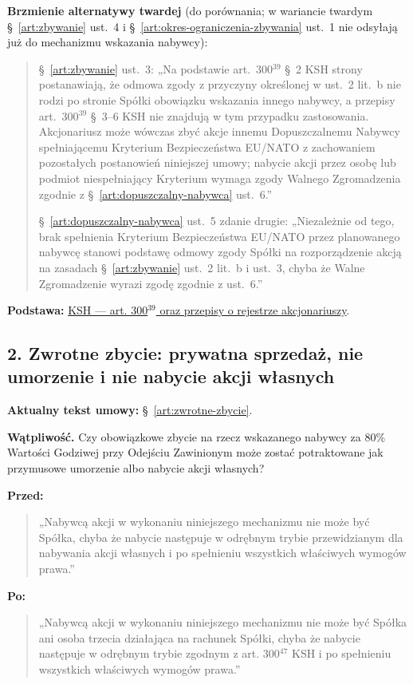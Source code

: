 \documentclass[12pt,a4paper]{report}
\begin{document}
\textbf{Brzmienie alternatywy twardej} (do porównania; w wariancie twardym §~\ref{art:zbywanie} ust.~4 i §~\ref{art:okres-ograniczenia-zbywania} ust.~1 nie odsyłają już do mechanizmu wskazania nabywcy):
\begin{quote}\small
§~\ref{art:zbywanie} ust.~3: „Na podstawie art.~300$^{39}$ §~2 KSH strony postanawiają, że odmowa zgody z przyczyny określonej w ust.~2 lit.~b nie rodzi po stronie Spółki obowiązku wskazania innego nabywcy, a przepisy art.~300$^{39}$ §~3--6 KSH nie znajdują w tym przypadku zastosowania. Akcjonariusz może wówczas zbyć akcje innemu Dopuszczalnemu Nabywcy spełniającemu Kryterium Bezpieczeństwa EU/NATO z zachowaniem pozostałych postanowień niniejszej umowy; nabycie akcji przez osobę lub podmiot niespełniający Kryterium wymaga zgody Walnego Zgromadzenia zgodnie z §~\ref{art:dopuszczalny-nabywca} ust.~6.”

§~\ref{art:dopuszczalny-nabywca} ust.~5 zdanie drugie: „Niezależnie od tego, brak spełnienia Kryterium Bezpieczeństwa EU/NATO przez planowanego nabywcę stanowi podstawę odmowy zgody Spółki na rozporządzenie akcją na zasadach §~\ref{art:zbywanie} ust.~2 lit.~b i ust.~3, chyba że Walne Zgromadzenie wyrazi zgodę zgodnie z ust.~6.”
\end{quote}

\textbf{Podstawa:} \href{https://eli.gov.pl/api/acts/DU/2024/18/text.html}{KSH --- art. 300$^{39}$ oraz przepisy o rejestrze akcjonariuszy}.

\subsection*{2. Zwrotne zbycie: prywatna sprzedaż, nie umorzenie i nie nabycie akcji własnych}
\textbf{Aktualny tekst umowy:} §~\ref{art:zwrotne-zbycie}.

\textbf{Wątpliwość.} Czy obowiązkowe zbycie na rzecz wskazanego nabywcy za 80\% Wartości Godziwej przy Odejściu Zawinionym może zostać potraktowane jak przymusowe umorzenie albo nabycie akcji własnych?

\textbf{Przed:}
\begin{quote}\small
„Nabywcą akcji w wykonaniu niniejszego mechanizmu nie może być Spółka, chyba że nabycie następuje w odrębnym trybie przewidzianym dla nabywania akcji własnych i po spełnieniu wszystkich właściwych wymogów prawa.”
\end{quote}

\textbf{Po:}
\begin{quote}\small
„Nabywcą akcji w wykonaniu niniejszego mechanizmu nie może być Spółka ani osoba trzecia działająca na rachunek Spółki, chyba że nabycie następuje w odrębnym trybie zgodnym z art. 300$^{47}$ KSH i po spełnieniu wszystkich właściwych wymogów prawa.”
\end{quote}
\end{document}
